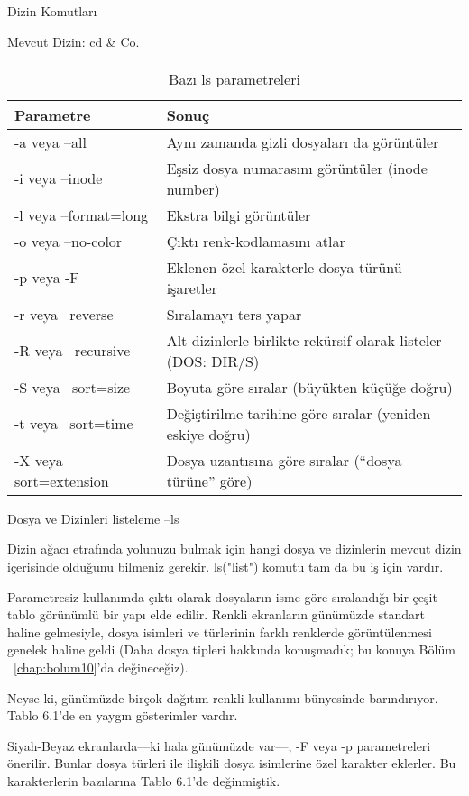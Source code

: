 \begin{section}{Dizin Komutları}
\begin{subsection}{Mevcut Dizin: cd \& Co.}
\paragraph{}{
\begin {table}[H]
\caption {Bazı ls parametreleri} \label{tab:title} 
\begin{tabular}{l l}
\hline
Parametre & Sonuç \\
\hline
-a veya --all 	&	Aynı zamanda gizli dosyaları da görüntüler \\
-i veya --inode 	&	Eşsiz dosya numarasını görüntüler (inode number) \\
-l veya --format=long 	&	Ekstra bilgi görüntüler \\
-o veya --no-color 	&	Çıktı renk-kodlamasını atlar \\
-p veya -F 	&	Eklenen özel karakterle dosya türünü işaretler \\
-r veya --reverse 	&	Sıralamayı ters yapar \\
-R veya --recursive 	&	Alt dizinlerle birlikte rekürsif olarak listeler (DOS: DIR/S) \\
-S veya --sort=size 	&	Boyuta göre sıralar (büyükten küçüğe doğru) \\
-t veya --sort=time 	&	Değiştirilme tarihine göre sıralar (yeniden eskiye doğru) \\
-X veya --sort=extension 	&	Dosya uzantısına göre sıralar (“dosya türüne” göre) \\
\hline
\end{tabular}
\end {table}
}
\end{subsection}
\begin{subsection}{Dosya ve Dizinleri listeleme --ls}

Dizin ağacı etrafında yolunuzu bulmak için hangi dosya ve dizinlerin mevcut dizin içerisinde olduğunu bilmeniz gerekir. ls("list") komutu tam da bu iş için vardır.

Parametresiz kullanımda çıktı olarak dosyaların isme göre sıralandığı bir çeşit tablo görünümlü bir yapı elde edilir. Renkli ekranların günümüzde standart haline gelmesiyle, dosya isimleri ve türlerinin farklı renklerde görüntülenmesi genelek haline geldi (Daha dosya tipleri hakkında konuşmadık; bu konuya Bölüm ~\ref{chap:bolum10}'da değineceğiz).
	
Neyse ki, günümüzde birçok dağıtım renkli kullanımı bünyesinde barındırıyor. Tablo 6.1'de en yaygın gösterimler vardır.

Siyah-Beyaz ekranlarda—ki hala günümüzde var—, -F veya -p parametreleri önerilir. Bunlar dosya türleri ile ilişkili dosya isimlerine özel karakter eklerler. Bu karakterlerin bazılarına Tablo 6.1'de değinmiştik.
	

\end{subsection}
\end{section}
